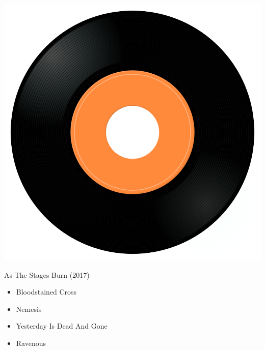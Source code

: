 \begin{minipage}[t]{0.25\textwidth}\vspace{0pt}
\captionsetup{type=figure}
\includegraphics[width=\textwidth]{Images/cover.png}
\caption*{As The Stages Burn (2017)}
\end{minipage}
\begin{minipage}[t]{0.25\textwidth}\vspace{0pt}
\begin{itemize}[nosep,leftmargin=1em,labelwidth=*,align=left]
	\setlength{\itemsep}{0pt}
	\item Bloodstained Cross
	\item Nemesis
	\item Yesterday Is Dead And Gone
	\item Ravenous
\end{itemize}
\end{minipage}
